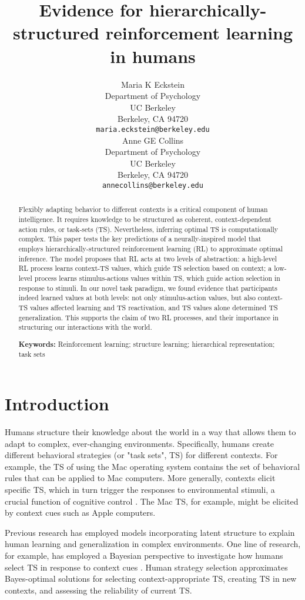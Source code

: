 \documentclass[10pt, letterpaper]{article}
\title{Evidence for hierarchically-structured reinforcement learning in humans}
\author{
  Maria K Eckstein \\
  Department of Psychology \\
  UC Berkeley \\
  Berkeley, CA 94720 \\
  \texttt{maria.eckstein@berkeley.edu} \\  
  \And
  Anne GE Collins \\
  Department of Psychology \\
  UC Berkeley \\
  Berkeley, CA 94720 \\
  \texttt{annecollins@berkeley.edu} \\
}
\begin{document}
\maketitle


\begin{abstract}

Flexibly adapting behavior to different contexts is a critical component of human intelligence. It requires knowledge to be structured as coherent, context-dependent action rules, or task-sets (TS). Nevertheless, inferring optimal TS is computationally complex. This paper tests the key predictions of a neurally-inspired model that employs hierarchically-structured reinforcement learning (RL) to approximate optimal inference. The model proposes that RL acts at two levels of abstraction: a high-level RL process learns context-TS values, which guide TS selection based on context; a low-level process learns stimulus-actions values within TS, which guide action selection in response to stimuli. In our novel task paradigm, we found evidence that participants indeed learned values at both levels: not only stimulus-action values, but also context-TS values affected learning and TS reactivation, and TS values alone determined TS generalization. This supports the claim of two RL processes, and their importance in structuring our interactions with the world.

\textbf{Keywords:} 
Reinforcement learning; structure learning; hierarchical representation; task sets

\end{abstract}


\section{Introduction}

Humans structure their knowledge about the world in a way that allows them to adapt to complex, ever-changing environments. Specifically, humans create different behavioral strategies (or "task sets", TS) for different contexts. For example, the TS of using the Mac operating system contains the set of behavioral rules that can be applied to Mac computers. More generally, contexts elicit specific TS, which in turn trigger the responses to environmental stimuli, a crucial function of cognitive control \cite{miller_integrative_2001}. The Mac TS, for example, might be elicited by context cues such as Apple computers.

Previous research has employed models incorporating latent structure to explain human learning and generalization in complex environments. One line of research, for example, has employed a Bayesian perspective to investigate how humans select TS in response to context cues \cite{collins_reasoning_2012, donoso_foundations_2014}. Human strategy selection approximates Bayes-optimal solutions for selecting context-appropriate TS, creating TS in new contexts, and assessing the reliability of current TS.
\end{document}
